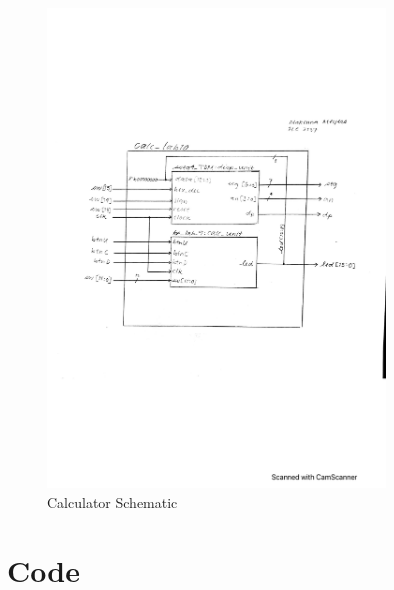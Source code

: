 \documentclass[11pt]{article}
\newcommand{\Verilog}[2][]{%
	
}
\begin{document}
\begin{figure}[ht]\centering
	\includegraphics[width=0.8\textwidth,trim=2cm 9cm 3cm 8cm,clip]{calc_lab10_schematic}
	\caption{Calculator Schematic}
	\label{fig:calc_schematic}			
\end{figure}
\clearpage

			
\section*{Code}

\Verilog[caption=Counter Module,label=code:counter]{counter.sv}

\Verilog[caption=Counter Test Bench,label=code:counter_test]{counter_test.sv}

\Verilog[caption=7-seg Driver Module,label=code:sseg4_TDM]{sseg4_TDM.sv}

\Verilog[caption=7-seg Driver Test Bench,label=code:sseg4_TDM_test]{sseg4_TDM_test.sv}

\Verilog[caption=Calculator Module,label=code:calc_module]{calc_lab10.sv}
\end{document}

